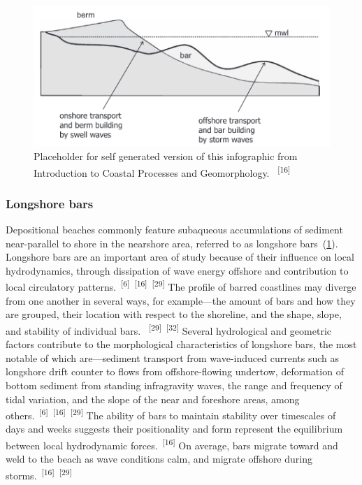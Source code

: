 \documentclass{article}
\begin{document}

\begin{figure}
    \centering
    \includegraphics[width=.9\linewidth]{images/barred-profile.png}
    \caption{Placeholder for self generated version of this infographic from Introduction to Coastal Processes and Geomorphology. ~\textsuperscript{[16]}}
    \label{figure9}
\end{figure}

\subsubsection{Longshore bars}


\par{Depositional beaches commonly feature subaqueous accumulations of sediment near-parallel to shore in the nearshore area, referred to as longshore bars~(\cref{figure9}). Longshore bars are an important area of study because of their influence on local hydrodynamics, through dissipation of wave energy offshore and contribution to local circulatory patterns.~\textsuperscript{[6]}~\textsuperscript{[16]}~\textsuperscript{[29]} The profile of barred coastlines may diverge from one another in several ways, for example---the amount of bars and how they are grouped, their location with respect to the shoreline, and the shape, slope, and stability of individual bars. ~\textsuperscript{[29]}~\textsuperscript{[32]} Several hydrological and geometric factors contribute to the morphological characteristics of longshore bars, the most notable of which are---sediment transport from wave-induced currents such as longshore drift counter to flows from offshore-flowing undertow, deformation of bottom sediment from standing infragravity waves, the range and frequency of tidal variation, and the slope of the near and foreshore areas, among others.~\textsuperscript{[6]}~\textsuperscript{[16]}~\textsuperscript{[29]} The ability of bars to maintain stability over timescales of days and weeks suggests their positionality and form represent the equilibrium between local hydrodynamic forces.~\textsuperscript{[16]} On average, bars migrate toward and weld to the beach as wave conditions calm, and migrate offshore during storms.~\textsuperscript{[16]}~\textsuperscript{[29]}}
\end{document}
